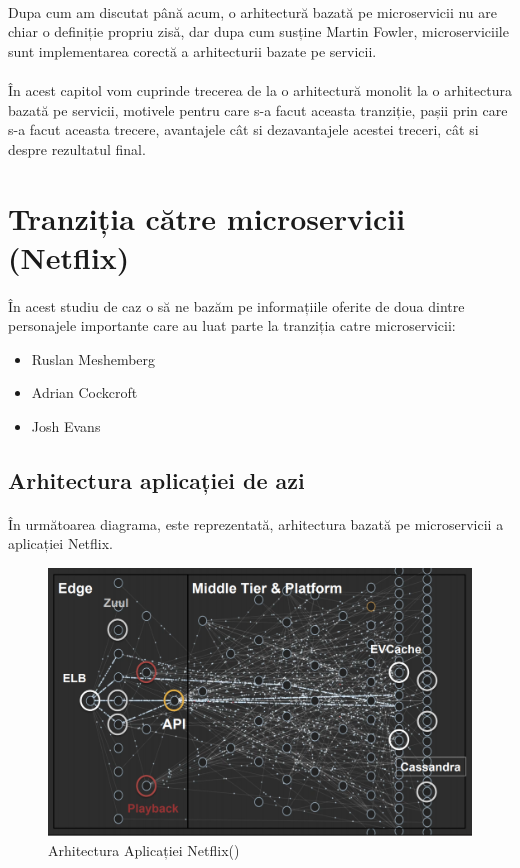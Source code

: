 \documentclass[12pt]{report}
\begin{document}
	\paragraph{}Dupa cum am discutat până acum, o arhitectură bazată pe microservicii nu are chiar o definiție propriu zisă, dar dupa cum susține Martin Fowler, microserviciile sunt implementarea corectă a arhitecturii bazate pe servicii.
	\paragraph{}În acest capitol vom cuprinde trecerea de la o arhitectură monolit la o arhitectura bazată pe servicii, motivele pentru care s-a facut aceasta tranziție, pașii prin care s-a facut aceasta trecere, avantajele cât si dezavantajele acestei treceri, cât si despre rezultatul final.
	\section{Tranziția către microservicii (Netflix)}
	\paragraph{}În acest studiu de caz o să ne bazăm pe informațiile oferite de doua dintre personajele importante care au luat parte la tranziția catre microservicii:
	\begin{itemize}
	\item Ruslan Meshemberg
	\item Adrian Cockcroft	
	\item Josh Evans	
	\end{itemize}
	\subsection{Arhitectura aplicației de azi}
	\paragraph{}În următoarea diagrama, este reprezentată, arhitectura bazată pe microservicii a aplicației Netflix.
	\begin{figure}[h]
  	\includegraphics[scale=.651]{netflixarhitecuture}
	\caption{Arhitectura Aplicației Netflix()}  
  	\end{figure}
\end{document}
